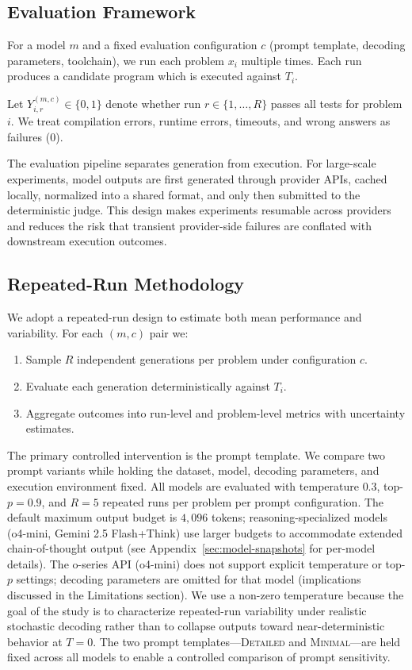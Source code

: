 \documentclass[11pt]{article}
\begin{document}
\subsection{Evaluation Framework}
For a model $m$ and a fixed evaluation configuration $c$ (prompt template, decoding parameters, toolchain), we run each problem $x_i$ multiple times. Each run produces a candidate program which is executed against $T_i$.

Let $Y_{i,r}^{(m,c)} \in \{0,1\}$ denote whether run $r \in \{1,\dots,R\}$ passes all tests for problem $i$. We treat compilation errors, runtime errors, timeouts, and wrong answers as failures ($0$).

The evaluation pipeline separates generation from execution. For large-scale experiments, model outputs are first generated through provider APIs, cached locally, normalized into a shared format, and only then submitted to the deterministic judge. This design makes experiments resumable across providers and reduces the risk that transient provider-side failures are conflated with downstream execution outcomes.

\subsection{Repeated-Run Methodology}
We adopt a repeated-run design to estimate both mean performance and variability. For each $(m,c)$ pair we:
\begin{enumerate}
  \item Sample $R$ independent generations per problem under configuration $c$.
  \item Evaluate each generation deterministically against $T_i$.
  \item Aggregate outcomes into run-level and problem-level metrics with uncertainty estimates.
\end{enumerate}

The primary controlled intervention is the prompt template. We compare two prompt variants while holding the dataset, model, decoding parameters, and execution environment fixed. All models are evaluated with temperature $0.3$, top-$p=0.9$, and $R=5$ repeated runs per problem per prompt configuration. The default maximum output budget is $4{,}096$ tokens; reasoning-specialized models (o4-mini, Gemini 2.5 Flash+Think) use larger budgets to accommodate extended chain-of-thought output (see Appendix~\ref{sec:model-snapshots} for per-model details). The o-series API (o4-mini) does not support explicit temperature or top-$p$ settings; decoding parameters are omitted for that model (implications discussed in the Limitations section). We use a non-zero temperature because the goal of the study is to characterize repeated-run variability under realistic stochastic decoding rather than to collapse outputs toward near-deterministic behavior at $T=0$. The two prompt templates---\textsc{Detailed} and \textsc{Minimal}---are held fixed across all models to enable a controlled comparison of prompt sensitivity.
\end{document}
